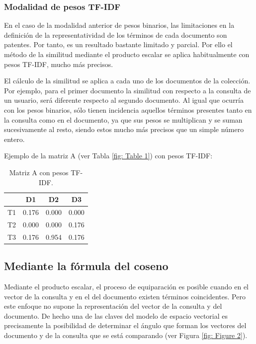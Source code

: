 \documentclass[titlepage]{article}
\begin{document}
\subsubsection{Modalidad de pesos TF-IDF}

En el caso de la modalidad anterior de pesos binarios, las limitaciones en la definición de la representatividad de los términos de cada documento son patentes. Por tanto, es un resultado bastante limitado y parcial. Por ello el método de la similitud mediante el producto escalar se aplica habitualmente con pesos TF-IDF, mucho más precisos.

El cálculo de la similitud se aplica a cada uno de los documentos de la colección. Por ejemplo, para el primer documento la similitud con respecto a la consulta de un usuario, será diferente respecto al segundo documento. Al igual que ocurría con los pesos binarios, sólo tienen incidencia aquellos términos presentes tanto en la consulta como en el documento, ya que sus pesos se multiplican y se suman sucesivamente al resto, siendo estos mucho más precisos que un simple número entero.

\newpage
Ejemplo de la matriz A (ver Tabla \ref{fig: Table 1}) con pesos TF-IDF:

\begin{table}[h]
	\begin{center}
		\begin{tabular}{ |c|c|c|c| }
			\hline 
			& D1 & D2 & D3 \\
			\hline
			T1 & 0.176 & 0.000 & 0.000 \\ 
			\hline
			T2 & 0.000 & 0.000	& 0.176 \\ 
			\hline
			T3 & 0.176 & 0.954 & 0.176 \\
			\hline
		\end{tabular}
		\caption{Matriz A con pesos TF-IDF.}
		\label{fig: Table 3}
	\end{center}
\end{table}

\subsection{Mediante la fórmula del coseno}

Mediante el producto escalar, el proceso de equiparación es posible cuando en el vector de la consulta y en el del documento existen términos coincidentes. Pero este enfoque no supone la representación del vector de la consulta y del documento. De hecho una de las claves del modelo de espacio vectorial es precisamente la posibilidad de determinar el ángulo que forman los vectores del documento y de la consulta que se está comparando (ver Figura \ref{fig: Figure 2}).
\end{document}
